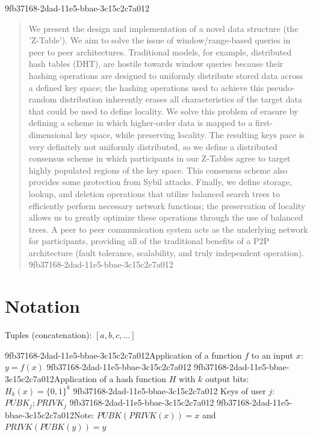 \documentclass[12pt]{article}
\begin{document}
\maketitle
9fb37168-2dad-11e5-bbae-3c15c2c7a012
\begin{abstract}
We present the design and implementation of a novel data structure (the 'Z-Table'). We aim to solve the issue of window/range-based queries in peer to peer architectures. Traditional models, for example,  distributed hash tables (DHT), are hostile towards window queries because their hashing operations are designed to uniformly distribute stored data across a defined key space; the hashing operations used to achieve this pseudo-random distribution inherently erases all characteristics of the target data that could be used to define locality. We solve this problem of erasure by defining a scheme in which higher-order data is mapped to a first-dimensional key space, while preserving locality. The resulting keys pace is very definitely not uniformly distributed, so we define a distributed consensus scheme in which participants in our Z-Tables agree to target highly populated regions of the key space. This consensus scheme also provides some protection from Sybil attacks. Finally, we define storage, lookup, and deletion operations that utilize balanced search trees to efficiently perform necessary network functions; the preservation of locality allows us to greatly optimize these operations through the use of balanced trees. A peer to peer communication system acts as the underlying network for participants, providing all of the traditional benefits of a P2P architecture (fault tolerance, scalability, and truly independent operation).
9fb37168-2dad-11e5-bbae-3c15c2c7a012\end{abstract}

\section{Notation}

Tuples (concatenation): $[a,b,c,...]$

9fb37168-2dad-11e5-bbae-3c15c2c7a012Application of a function $f$ to an input $x$: $y=f(x)$
9fb37168-2dad-11e5-bbae-3c15c2c7a012
9fb37168-2dad-11e5-bbae-3c15c2c7a012Application of a hash function $H$ with $k$ output bits: $H_{k}(x) = \{0,1\}^k$
9fb37168-2dad-11e5-bbae-3c15c2c7a012
Keys of user $j$: $ PUBK_j; PRIVK_j $
9fb37168-2dad-11e5-bbae-3c15c2c7a012
9fb37168-2dad-11e5-bbae-3c15c2c7a012Note: $PUBK(PRIVK(x)) = x$ and $PRIVK(PUBK(y)) = y$~
\end{document}

